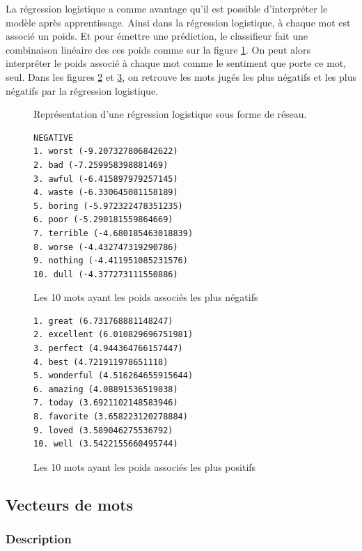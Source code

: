 \documentclass{article}
\begin{document}
La régression logistique a comme avantage qu'il est possible d'interpréter le modèle après apprentissage. Ainsi dans la régression logistique, à chaque mot est associé un poids. Et pour émettre une prédiction, le classifieur fait une combinaison linéaire des ces poids comme sur la figure \ref{lr_net}. On peut alors interpréter le poids associé à chaque mot comme le sentiment que porte ce mot, seul. Dans les figures \ref{negative} et \ref{positive}, on retrouve les mots jugés les plus négatifs et les plus négatifs par la régression logistique.

\begin{figure}[h]
\begin{center}

\end{center}
\caption{Représentation d'une régression logistique sous forme de réseau.}
\label{lr_net}
\end{figure}


\begin{figure}[h][h]
\begin{verbatim}
NEGATIVE
1. worst (-9.207327806842622)
2. bad (-7.259958398881469)
3. awful (-6.415897979257145)
4. waste (-6.330645081158189)
5. boring (-5.972322478351235)
6. poor (-5.290181559864669)
7. terrible (-4.680185463018839)
8. worse (-4.432747319290786)
9. nothing (-4.411951085231576)
10. dull (-4.377273111550886)
\end{verbatim}
\caption{Les 10 mots ayant les poids associés les plus négatifs}
\label{negative}
\end{figure}

\begin{figure}[h][h]
\begin{verbatim}
1. great (6.731768881148247)
2. excellent (6.010829696751981)
3. perfect (4.944364766157447)
4. best (4.721911978651118)
5. wonderful (4.516264655915644)
6. amazing (4.08891536519038)
7. today (3.6921102148583946)
8. favorite (3.658223120278884)
9. loved (3.589046275536792)
10. well (3.5422155660495744)
\end{verbatim}
\caption{Les 10 mots ayant les poids associés les plus positifs}
\label{positive}
\end{figure}

\subsection{Vecteurs de mots}

\subsubsection{Description}
\end{document}
